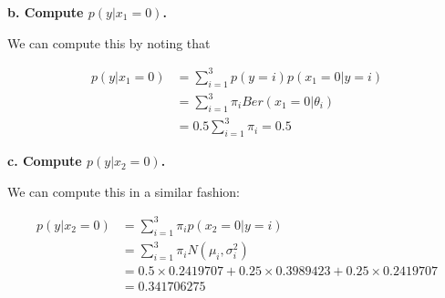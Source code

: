 {\textbf{b. Compute $p(y|x_1=0)$.}

We can compute this by noting that

\begin{align}
    p(y|x_1=0) & = \sum_{i=1}^{3} p(y=i)p(x_1=0|y=i) \\
    & = \sum_{i=1}^{3} \pi_{i} Ber(x_1=0|\theta_i) \\
    & = 0.5 \sum_{i=1}^{3} \pi_i = 0.5
\end{align}

\textbf{c. Compute $p(y|x_2=0)$.}

We can compute this in a similar fashion:

\begin{align}
    p(y|x_2=0) & = \sum_{i=1}^{3} \pi_i p(x_2=0|y=i) \\
    & = \sum_{i=1}^{3} \pi_i N(\mu_i, \sigma^2_i) \\
    & = 0.5 \times 0.2419707 + 0.25 \times 0.3989423 + 0.25 \times 0.2419707 \\
    & = 0.341706275
\end{align}

}

